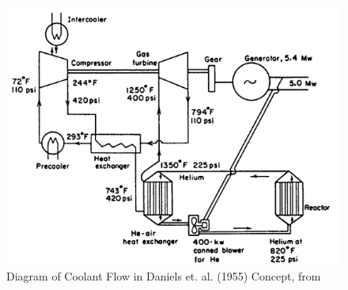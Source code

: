 \begin{figure}[h!]
\centering
\includegraphics[width=0.6\linewidth]{figures/daniels-2}
\caption{Diagram of Coolant Flow in Daniels et. al. (1955) Concept, from \cite{simnad_early_1991}}
\label{fig:daniels-2}
\end{figure}